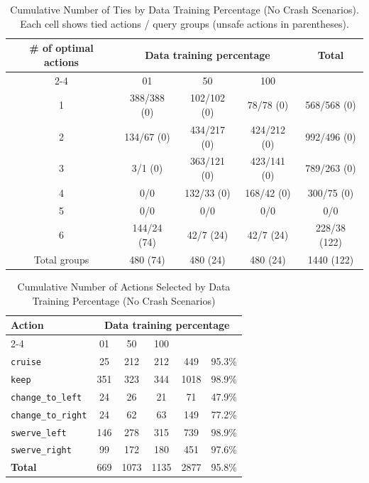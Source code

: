 \documentclass{article}
\begin{document}
\begin{table}[h]
\centering
\caption{Cumulative Number of Ties by Data Training Percentage (No Crash Scenarios).
Each cell shows tied actions / query groups (unsafe actions in parentheses).}
\begin{tabular}{c|ccc|c}
\toprule
\multirow{2}{*}{\# of optimal actions} & \multicolumn{3}{c|}{Data training percentage} & \multirow{2}{*}{Total} \\
\cmidrule{2-4}
 & 01 & 50 & 100 & \\
\midrule
1 & 388/388 (0) & 102/102 (0) & 78/78 (0) & 568/568 (0) \\ 
2 & 134/67 (0) & 434/217 (0) & 424/212 (0) & 992/496 (0) \\ 
3 & 3/1 (0) & 363/121 (0) & 423/141 (0) & 789/263 (0) \\ 
4 & 0/0 & 132/33 (0) & 168/42 (0) & 300/75 (0) \\ 
5 & 0/0 & 0/0 & 0/0 & 0/0 \\ 
6 & 144/24 (74) & 42/7 (24) & 42/7 (24) & 228/38 (122) \\ 
\midrule
Total groups & 480 (74) & 480 (24) & 480 (24) & 1440 (122) \\ 
\bottomrule
\end{tabular}
\end{table}

\begin{table}[h]
\centering
\caption{Cumulative Number of Actions Selected by Data Training Percentage (No Crash Scenarios)}
\begin{tabular}{l|ccc|c|c}
\toprule
\multirow{2}{*}{Action} & \multicolumn{5}{c|}{Data training percentage} & \multirow{2}{*}{Total} & \multirow{2}{*}{Safe (\%)} \\
\cmidrule{2-4}
 & 01 & 50  & 100 & & \\
\midrule
\texttt{cruise} & 25 & 212 & 212 & 449 & 95.3\% \\ 
\texttt{keep} & 351 & 323 & 344 & 1018 & 98.9\% \\ 
\texttt{change\_to\_left} & 24 & 26 & 21 & 71 & 47.9\% \\ 
\texttt{change\_to\_right} & 24 & 62 & 63 & 149 & 77.2\% \\ 
\texttt{swerve\_left} & 146 & 278 & 315 & 739 & 98.9\% \\ 
\texttt{swerve\_right} & 99 & 172 & 180 & 451 & 97.6\% \\ 
\midrule
\textbf{Total} & 669 & 1073 & 1135 & 2877 & 95.8\% \\ 
\bottomrule
\end{tabular}
\end{table}
\end{document}
